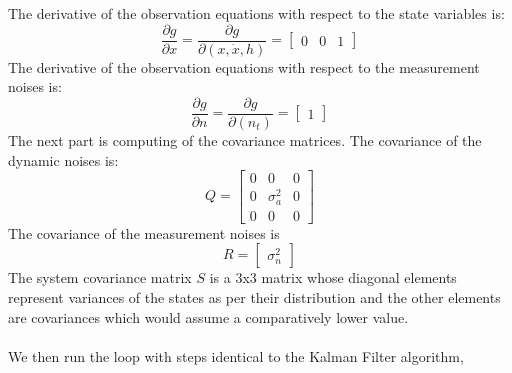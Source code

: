 \documentclass{article}
\begin{document}
The derivative of the observation equations with respect to the state variables is:
\begin{equation}
\frac{\partial g}{\partial x} =
\frac{\partial g}{\partial (x,\dot{x},h)} =
\begin{bmatrix}
0 & 0 & 1
\end{bmatrix}
\end{equation}
The derivative of the observation equations with respect to the
measurement noises is:
\begin{equation}
\frac{\partial g}{\partial n} =
\frac{\partial g}{\partial (n_t)} =
\begin{bmatrix}
1 
\end{bmatrix}
\end{equation}
The next part is computing of the covariance matrices. 
The covariance of the dynamic noises is:
\begin{equation}
Q = \begin{bmatrix}
0 & 0 & 0  \\
0 & \sigma_a^2 & 0  \\
0 & 0 & 0 
\end{bmatrix}
\end{equation}
The covariance of the measurement noises is
\begin{equation}
R = \begin{bmatrix}
\sigma_n^2
\end{bmatrix}
\end{equation}
The system covariance matrix $S$ is a $3$x$3$ matrix whose diagonal elements represent variances of the states as per their distribution and the other elements are covariances which would assume a comparatively lower value.

\paragraph{}	We then run the loop with steps identical to the Kalman Filter algorithm,
\end{document}
